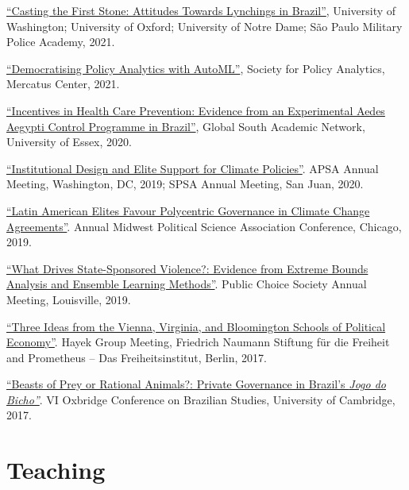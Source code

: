 \documentclass[a4paper]{article}
\renewenvironment{itemize}{
	\begin{list}{}{
			\setlength{\leftmargin}{1.5em}
		}
		}{
	\end{list}
}
\begin{document}
\begin{itemize}
\item \href{https://github.com/danilofreire/lynching-experiment-brazil}{``Casting the First Stone: Attitudes Towards Lynchings in Brazil''}, University of Washington; University of Oxford; University of Notre Dame; São Paulo Military Police Academy, 2021.
\item \href{http://github.com/danilofreire/mercatus-analytics-papers}{``Democratising Policy Analytics with AutoML''}, Society for Policy Analytics, Mercatus Center, 2021.
\item \href{https://danilofreire.github.io/essex2020/aedes.html}{``Incentives in Health Care Prevention: Evidence from an Experimental Aedes Aegypti Control Programme in Brazil''}, Global South Academic Network, University of Essex, 2020.
\item \href{https://osf.io/9a6ch}{``Institutional Design and Elite Support for Climate Policies''}. APSA Annual Meeting, Washington, DC, 2019; SPSA Annual Meeting, San Juan, 2020.
\item \href{https://osf.io/9a6ch}{``Latin American Elites Favour Polycentric Governance in Climate Change Agreements''}. Annual Midwest Political Science Association Conference, Chicago, 2019.
\item \href{http://danilofreire.github.io/pcs-2019}{``What Drives State-Sponsored Violence?: Evidence from Extreme Bounds Analysis and Ensemble Learning Methods''}. Public Choice Society Annual Meeting, Louisville, 2019.
\item \href{https://www.overleaf.com/project/591ef5259fb58ede3dc4d369}{``Three Ideas from the Vienna, Virginia, and Bloomington Schools of Political Economy''}. Hayek Group Meeting, Friedrich Naumann Stiftung f{\"u}r die Freiheit and Prometheus -- Das Freiheitsinstitut, Berlin, 2017.
\item \href{https://osf.io/se2jr}{``Beasts of Prey or Rational Animals?: Private Governance in Brazil's \emph{Jogo do Bicho''}}. VI Oxbridge Conference on Brazilian Studies, University of Cambridge, 2017.
\end{itemize}

\section*{Teaching}
\end{document}
